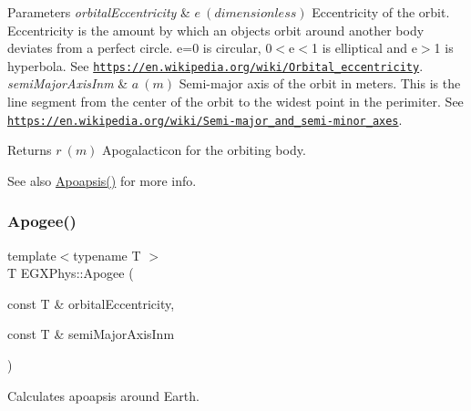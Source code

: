 \begin{DoxyParams}{Parameters}
{\em orbital\+Eccentricity} & $ e\ (dimensionless)$ Eccentricity of the orbit. Eccentricity is the amount by which an objects orbit around another body deviates from a perfect circle. e=0 is circular, 0$<$e$<$1 is elliptical and e$>$1 is hyperbola. See \href{https://en.wikipedia.org/wiki/Orbital_eccentricity}{\tt https\+://en.\+wikipedia.\+org/wiki/\+Orbital\+\_\+eccentricity}. \\
\hline
{\em semi\+Major\+Axis\+Inm} & $ a\ (m)$ Semi-\/major axis of the orbit in meters. This is the line segment from the center of the orbit to the widest point in the perimiter. See \href{https://en.wikipedia.org/wiki/Semi-major_and_semi-minor_axes}{\tt https\+://en.\+wikipedia.\+org/wiki/\+Semi-\/major\+\_\+and\+\_\+semi-\/minor\+\_\+axes}. \\
\hline
\end{DoxyParams}
\begin{DoxyReturn}{Returns}
$ r\ (m)$ Apogalacticon for the orbiting body. 
\end{DoxyReturn}
\begin{DoxySeeAlso}{See also}
\mbox{\hyperlink{group___e_g_x_phys-_apoapsis_gafd08a2d1d64886e7bb9bcb7ff65bc3ea}{Apoapsis()}} for more info. 
\end{DoxySeeAlso}
\mbox{\label{group___e_g_x_phys-_apoapsis_ga5bb3b3a83de372ffaf9af3ab77d6f408}} 
\subsubsection{\texorpdfstring{Apogee()}{Apogee()}}
{\footnotesize\ttfamily template$<$typename T $>$ \\
T E\+G\+X\+Phys\+::\+Apogee (\begin{DoxyParamCaption}\item[{const T \&}]{orbital\+Eccentricity,  }\item[{const T \&}]{semi\+Major\+Axis\+Inm }\end{DoxyParamCaption})}



Calculates apoapsis around Earth. 



